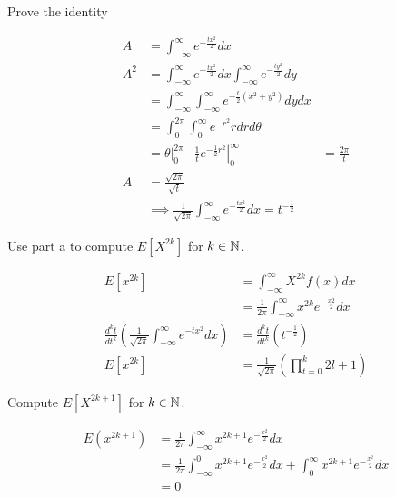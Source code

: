 \documentclass[11pt]{article}
\newcommand*\Eval[3]{\left.#1\right\rvert_{#2}^{#3}}
\begin{document}
\begin{Parts}
    
    \Part Prove the identity

    \begin{Answer}
        \begin{align*}
            A   &= \int_{-\infty}^{\infty} e^{-\frac{tx^2}{2}} dx \\
            A^2 &= \int_{-\infty}^{\infty} e^{-\frac{tx^2}{2}} dx \int_{-\infty}^{\infty} e^{-\frac{ty^2}{2}} dy \\
                &= \int_{-\infty}^{\infty} \int_{-\infty}^{\infty} e^{-\frac{t}{2}(x^2+y^2)} dy dx \\
                &= \int_{0}^{2\pi} \int_{0}^{\infty} e^{-r^2}r dr d\theta \\
                &= \Eval{\theta}{0}{2\pi} \Eval{-\frac{1}{t}e^{-\frac{1}{2}r^2}}{0}{\infty}
                &= \frac{2\pi}{t} \\
            A   &= \frac{\sqrt{2\pi}}{\sqrt{t}} \\
                &\implies \frac{1}{\sqrt{2\pi}} \int_{-\infty}^{\infty} e^{-\frac{tx^2}{2}} dx = t^{-\frac{1}{2}}
        \end{align*}
    \end{Answer}

    \Part Use part a to compute $E[X^{2k}]$ for $k \in \mathbb{N}$.

    \begin{Answer}
        \begin{align*}
            E[x^{2k}] &= \int_{-\infty}^{\infty} X^{2k}f(x) dx \\
                      &= \frac{1}{2\pi} \int_{-\infty}^{\infty} x^{2k} e^{-\frac{x2}{2}} dx \\
            \frac{d^kt}{dt^k}(\frac{1}{\sqrt{2\pi}} \int_{-\infty}^{\infty} e^{-tx^2} dx) &= \frac{d^kt}{dt^k}(t^{-\frac{1}{2}}) \\
            E[x^{2k}] &= \frac{1}{\sqrt{2\pi}} (\prod_{t=0}^k 2l + 1)
        \end{align*}
    \end{Answer}

    \newpage
    \Part Compute $E[X^{2k+1}]$ for $k \in \mathbb{N}$. 

    \begin{Answer}
        \begin{align*}
            E(x^{2k+1}) &= \frac{1}{2\pi} \int_{-\infty}^{\infty} x^{2k+1} e^{-\frac{x^2}{2}} dx \\
                        &= \frac{1}{2\pi} \int_{-\infty}^0 x^{2k+1} e^{-\frac{x^2}{2}} dx + \int_0^{\infty} x^{2k+1} e^{-\frac{x^2}{2}} dx \\
                        &= 0
        \end{align*}
    \end{Answer}

\end{Parts}
\end{document}
